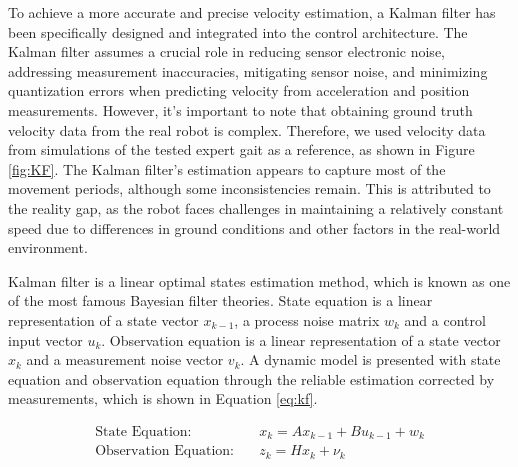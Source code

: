 To achieve a more accurate and precise velocity estimation, a Kalman filter has been specifically designed and integrated into the control architecture. The Kalman filter assumes a crucial role in reducing sensor electronic noise, addressing measurement inaccuracies, mitigating sensor noise, and minimizing quantization errors when predicting velocity from acceleration and position measurements. However, it's important to note that obtaining ground truth velocity data from the real robot is complex. Therefore, we used velocity data from simulations of the tested expert gait as a reference, as shown in Figure \ref{fig:KF}. The Kalman filter's estimation appears to capture most of the movement periods, although some inconsistencies remain. This is attributed to the reality gap, as the robot faces challenges in maintaining a relatively constant speed due to differences in ground conditions and other factors in the real-world environment.

Kalman filter is a linear optimal states estimation method, which is known as one of the most famous Bayesian filter theories. State equation is a linear representation of a state vector $x_{k-1}$, a process noise matrix $w_{k}$ and a control input vector $u_{k}$. Observation equation is a linear representation of a state vector $x_{k}$ and a measurement noise vector $v_{k}$. A dynamic model is presented with state equation and observation equation through the reliable estimation corrected by measurements, which is shown in Equation \ref{eq:kf}.

\begin{equation}
    \begin{aligned}
        \text{State Equation:} \quad & x_{k} = A x_{k-1} + B u_{k-1} + w_{k} \\
        \text{Observation Equation:} \quad & z_{k} = H x_{k} + \nu_{k}
    \end{aligned}
\label{eq:kf}
\end{equation}

